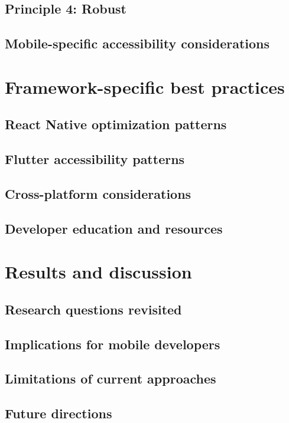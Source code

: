 \subsection{Principle 4: Robust}

\subsection{Mobile-specific accessibility considerations}

\section{Framework-specific best practices}

\subsection{React Native optimization patterns}

\subsection{Flutter accessibility patterns}

\subsection{Cross-platform considerations}

\subsection{Developer education and resources}

\section{Results and discussion}

\subsection{Research questions revisited}

\subsection{Implications for mobile developers}

\subsection{Limitations of current approaches}

\subsection{Future directions}

\newpage
